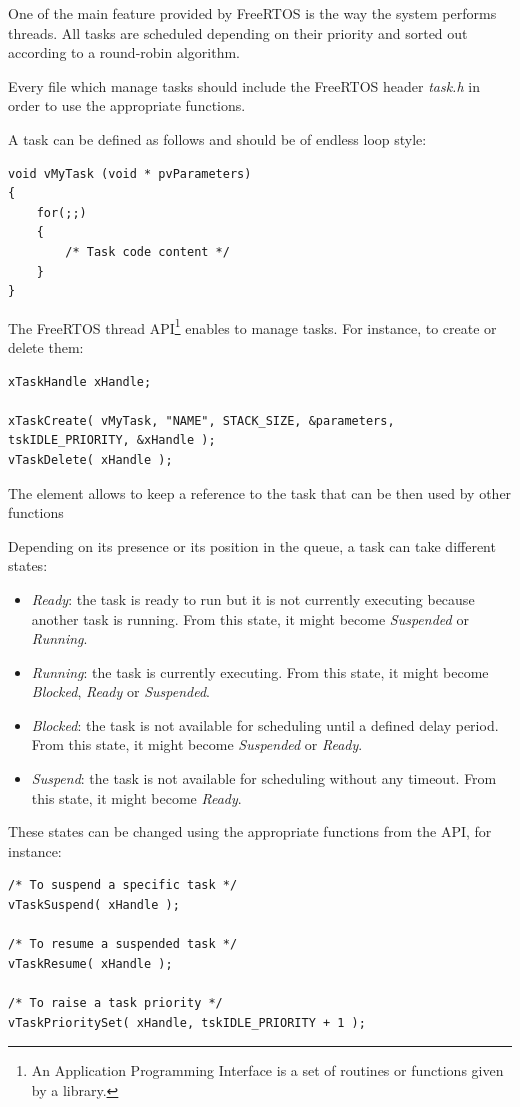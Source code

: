 \hspace{15mm}One of the main feature provided by FreeRTOS is the way the system performs threads. All tasks are scheduled depending on their priority and sorted out according to a round-robin algorithm.

Every file which manage tasks should include the FreeRTOS header \textit{task.h} in order to use the appropriate functions.

A task can be defined as follows and should be of endless loop style:\clearpage
\begin{lstlisting}
void vMyTask (void * pvParameters)
{
	for(;;)
	{
		/* Task code content */
	}
}
\end{lstlisting}

The FreeRTOS thread API\footnote{An Application Programming Interface is a set of routines or functions given by a library.} enables to manage tasks. For instance, to create or delete them:
\begin{lstlisting}
xTaskHandle xHandle;

xTaskCreate( vMyTask, "NAME", STACK_SIZE, &parameters, tskIDLE_PRIORITY, &xHandle );
vTaskDelete( xHandle );
\end{lstlisting}
The  element allows to keep a reference to the task that can be then used by other functions

Depending on its presence or its position in the queue, a task can take different states:
\begin{itemize}
\item \textit{Ready}: the task is ready to run but it is not currently executing because another task is running. From this state, it might become \textit{Suspended} or \textit{Running}.
\item \textit{Running}: the task is currently executing. From this state, it might become \textit{Blocked}, \textit{Ready} or \textit{Suspended}.
\item \textit{Blocked}: the task is not available for scheduling until a defined delay period. From this state, it might become \textit{Suspended} or \textit{Ready}.
\item \textit{Suspend}: the task is not available for scheduling without any timeout. From this state, it might become \textit{Ready}.
\end{itemize}
These states can be changed using the appropriate functions from the API, for instance:
\begin{lstlisting}
/* To suspend a specific task */
vTaskSuspend( xHandle );

/* To resume a suspended task */
vTaskResume( xHandle );

/* To raise a task priority */
vTaskPrioritySet( xHandle, tskIDLE_PRIORITY + 1 );
\end{lstlisting}


